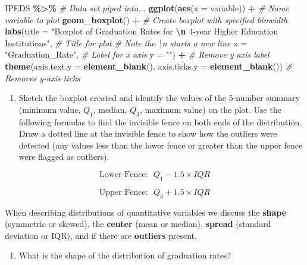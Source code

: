 \documentclass[
]{report}
\newenvironment{Shaded}{\begin{snugshade}}{\end{snugshade}}
\newcommand{\AttributeTok}[1]{\textcolor[rgb]{0.13,0.29,0.53}{#1}}
\newcommand{\CommentTok}[1]{\textcolor[rgb]{0.56,0.35,0.01}{\textit{#1}}}
\newcommand{\FunctionTok}[1]{\textcolor[rgb]{0.13,0.29,0.53}{\textbf{#1}}}
\newcommand{\NormalTok}[1]{#1}
\newcommand{\SpecialCharTok}[1]{\textcolor[rgb]{0.81,0.36,0.00}{\textbf{#1}}}
\newcommand{\StringTok}[1]{\textcolor[rgb]{0.31,0.60,0.02}{#1}}
\providecommand{\tightlist}{%
  \setlength{\itemsep}{0pt}\setlength{\parskip}{0pt}}
\begin{document}
\begin{Shaded}
\begin{Highlighting}[]
\NormalTok{IPEDS }\SpecialCharTok{\%\textgreater{}\%} \CommentTok{\# Data set piped into...}
\FunctionTok{ggplot}\NormalTok{(}\FunctionTok{aes}\NormalTok{(}\AttributeTok{x =}\NormalTok{ variable)) }\SpecialCharTok{+}   \CommentTok{\# Name variable to plot}
  \FunctionTok{geom\_boxplot}\NormalTok{() }\SpecialCharTok{+}  \CommentTok{\# Create boxplot with specified binwidth}
  \FunctionTok{labs}\NormalTok{(}\AttributeTok{title =} \StringTok{"Boxplot of Graduation Rates for }\SpecialCharTok{\textbackslash{}n}\StringTok{ 4{-}year Higher Education Institutions"}\NormalTok{, }
           \CommentTok{\# Title for plot}
           \CommentTok{\# Note the \textbackslash{}n starts a new line}
       \AttributeTok{x =} \StringTok{"Graduation\_Rate"}\NormalTok{, }\CommentTok{\# Label for x axis}
       \AttributeTok{y =} \StringTok{""}\NormalTok{) }\SpecialCharTok{+} \CommentTok{\# Remove y axis label}
    \FunctionTok{theme}\NormalTok{(}\AttributeTok{axis.text.y =} \FunctionTok{element\_blank}\NormalTok{(), }
          \AttributeTok{axis.ticks.y =} \FunctionTok{element\_blank}\NormalTok{()) }\CommentTok{\# Removes y{-}axis ticks}
\end{Highlighting}
\end{Shaded}

\begin{enumerate}
\def\labelenumi{\arabic{enumi}.}
\setcounter{enumi}{6}
\tightlist
\item
  Sketch the boxplot created and identify the values of the 5-number summary (minimum value, \(Q_1\), median, \(Q_3\), maximum value) on the plot. Use the following formulas to find the invisible fence on both ends of the distribution. Draw a dotted line at the invisible fence to show how the outliers were detected (any values less than the lower fence or greater than the upper fence were flagged as outliers).
\end{enumerate}

\[\text{Lower Fence:} ~~~ Q_1 - 1.5\times IQR\]

\[\text{Upper Fence:} ~~~ Q_3 + 1.5\times IQR\]
\vspace{1.8in}

When describing distributions of quantitative variables we discuss the \textbf{shape} (symmetric or skewed), the \textbf{center} (mean or median), \textbf{spread} (standard deviation or IQR), and if there are \textbf{outliers} present.

\begin{enumerate}
\def\labelenumi{\arabic{enumi}.}
\setcounter{enumi}{7}
\tightlist
\item
  What is the shape of the distribution of graduation rates?
\end{enumerate}
\end{document}
